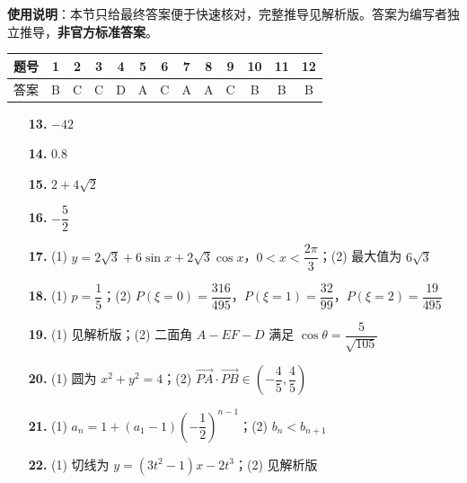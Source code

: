 
\begin{gknotice}
\textbf{使用说明}：本节只给最终答案便于快速核对，完整推导见解析版。答案为编写者独立推导，\textbf{非官方标准答案}。
\end{gknotice}

\begin{center}\begin{tabular}{ccccccccccccc}
\toprule
题号 & 1 & 2 & 3 & 4 & 5 & 6 & 7 & 8 & 9 & 10 & 11 & 12 \\
\midrule
答案 & B & C & C & D & A & C & A & A & C & B & B & B \\
\bottomrule
\end{tabular}\end{center}

\begin{itemize}[leftmargin=2.6em]
  \item[\textbf{13.}] $-42$
  \item[\textbf{14.}] $0.8$
  \item[\textbf{15.}] $2+4\sqrt2$
  \item[\textbf{16.}] $-\dfrac52$
\end{itemize}

\begin{itemize}[leftmargin=2.6em]
  \item[\textbf{17.}] (1) $y=2\sqrt3+6\sin x+2\sqrt3\cos x$，$0<x<\dfrac{2\pi}3$；(2) 最大值为 $6\sqrt3$
  \item[\textbf{18.}] (1) $p=\dfrac15$；(2) $P(\xi=0)=\dfrac{316}{495}$，$P(\xi=1)=\dfrac{32}{99}$，$P(\xi=2)=\dfrac{19}{495}$
  \item[\textbf{19.}] (1) 见解析版；(2) 二面角 $A-EF-D$ 满足 $\cos\theta=\dfrac5{\sqrt{105}}$
  \item[\textbf{20.}] (1) 圆为 $x^2+y^2=4$；(2) $\overrightarrow{PA}\cdot\overrightarrow{PB}\in\left(-\dfrac45,\dfrac45\right)$
  \item[\textbf{21.}] (1) $a_n=1+(a_1-1)\left(-\dfrac12\right)^{n-1}$；(2) $b_n<b_{n+1}$
  \item[\textbf{22.}] (1) 切线为 $y=(3t^2-1)x-2t^3$；(2) 见解析版
\end{itemize}
